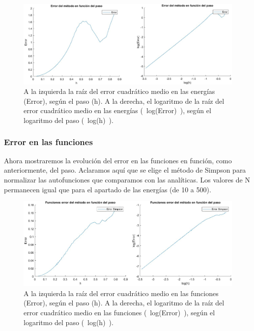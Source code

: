 \documentclass[12pt]{article}
\begin{document}
\begin{figure}[H]
    \centering
    \begin{adjustbox}{width=1.2\linewidth,center}
        \includegraphics{fotos/errorosciladorenegias.png}
    \end{adjustbox}
    \caption{A la izquierda la raíz del error cuadrático medio en las energías (Error), según el paso (h). A la derecha, el logaritmo de la raíz del error cuadrático medio en las energías (~log(Error)~), según el logaritmo del paso (~log(h)~).}
\end{figure}

     \subsubsection{Error en las funciones}

    Ahora mostraremos la evolución del error en las funciones en función, como anteriormente, del paso. Aclaramos aquí que se elige el método de Simpson para normalizar las autofunciones que comparamos con las analíticas. Los valores de N permanecen igual que para el apartado de las energías (de 10 a 500).

\begin{figure}[H]
    \centering
    \begin{adjustbox}{width=1.2\linewidth,center}
        \includegraphics{fotos/errorfuncionseoscilador.png}
    \end{adjustbox}
    \caption{A la izquierda la raíz del error cuadrático medio en las funciones (Error), según el paso (h). A la derecha, el logaritmo de la raíz del error cuadrático medio en las funciones (~log(Error)~), según el logaritmo del paso (~log(h)~).}
\end{figure}
        
\end{document}
